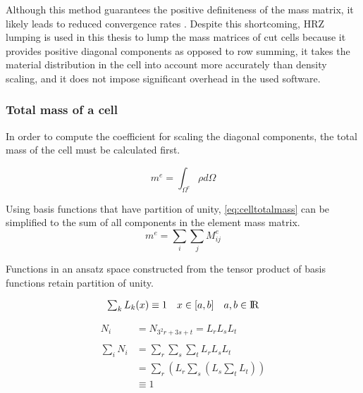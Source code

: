 Although this method guarantees the positive definiteness of the mass matrix, it
likely leads to reduced convergence rates \cite{Duczek2019}. Despite this shortcoming,
HRZ lumping is used in this thesis to lump the mass matrices of cut cells because
it provides positive diagonal components as opposed to row summing, it takes the
material distribution in the cell into account more accurately than density scaling, and
it does not impose significant overhead in the used software.

\subsubsection*{Total mass of a cell}
\label{section:totalmassofacell}

In order to compute the coefficient for scaling the diagonal components, the total
mass of the cell must be calculated first.

\begin{equation} \label{eq:celltotalmass}
	m^e = \int_{\Omega^e} \rho d\Omega
\end{equation}

Using basis functions that have partition of unity, \ref{eq:celltotalmass} can
be simplified to the sum of all components in the element mass matrix.
\begin{equation} \label{eq:sumofmassmatrixcomponents}
	m^e = \sum_i \sum_j M_{ij}^e
\end{equation}


Functions in an ansatz space constructed from the tensor product of basis functions
retain partition of unity.

\begin{equation*}
\begin{array}{lll}
	\sum_k L_k(x) \equiv 1 & x \in [a,b] & a,b \in \rm I\!R \\
\end{array}
\end{equation*}

\begin{equation}
\begin{array}{ll}
	N_i &= N_{3^2r + 3s + t} = L_r L_s L_t \\
	\\
	\sum_i N_i
	&= \sum_r \sum_s \sum_t L_r L_s L_t	\\
	&= \sum_r
	\left(
		L_r \sum_s
		\left(
			L_s \sum_t L_t
		\right)
	\right) \\
	& \equiv 1
\end{array}
\end{equation}


